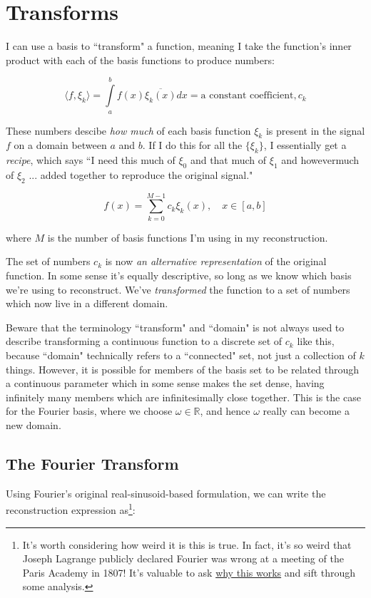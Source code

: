 \documentclass[10pt]{article}
\begin{document}
\section{Transforms}

I can use a basis to ``transform" a function, meaning I take the function's inner product with each of the basis functions to produce numbers:

$$ \langle f,\xi_k \rangle = \int\limits_{a}^{b} f(x) \overline{\xi_k(x)} dx = \text{a constant coefficient}, c_k $$

These numbers descibe \textit{how much} of each basis function $\xi_k$ is present in the signal $f$ on a domain between $a$ and $b$. If I do this for all the $\{\xi_k\}$, I essentially get a \textit{recipe}, which says ``I need this much of $\xi_0$ and that much of $\xi_1$ and howevermuch of $\xi_2$ ... added together to reproduce the original signal."

$$ f(x) = \sum_{k=0}^{M-1} c_k \xi_k(x), \quad x \in [a, b] $$

where $M$ is the number of basis functions I'm using in my reconstruction.\newline

The set of numbers $c_k$ is now \textit{an alternative representation} of the original function. In some sense it's equally descriptive, so long as we know which basis we're using to reconstruct. We've \textit{transformed} the function to a set of numbers which now live in a different domain.

Beware that the terminology ``transform" and ``domain" is not always used to describe transforming a continuous function to a discrete set of $c_k$ like this, because ``domain" technically refers to a ``connected" set, not just a collection of $k$ things. However, it is possible for members of the basis set to be related through a continuous parameter which in some sense makes the set dense, having infinitely many members which are infinitesimally close together. This is the case for the Fourier basis, where we choose $\omega \in \mathbb{R}$, and hence $\omega$ really can become a new domain.

\subsection{The Fourier Transform}\label{fourier}

Using Fourier's original real-sinusoid-based formulation, we can write the reconstruction expression as\footnote{It's worth considering how weird it is this is true. In fact, it's so weird that Joseph Lagrange publicly declared Fourier was wrong at a meeting of the Paris Academy in 1807!\cite{michigan} It's valuable to ask \href{https://math.stackexchange.com/questions/1105265/why-do-fourier-series-work}{why this works}\cite{why} and sift through some analysis.}:
\end{document}
